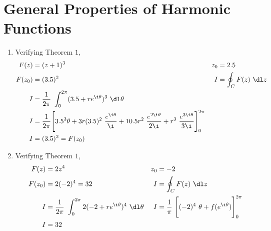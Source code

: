 \section{General Properties of Harmonic Functions}

\begin{enumerate}
    \item Verifying Theorem $ 1 $,
          \begin{align}
              F(z)   & = (z + 1)^3                                     &
              z_0    & = 2.5                                             \\
              F(z_0) & = (3.5)^3                                       &
              I      & = \oint_C F(z)\ \dl z                             \\
              I      & = \frac{1}{2\pi}\ \int_{0}^{2\pi}
              (3.5 + re^{\i \theta})^3\ \dl \theta                       \\
              I      & = \frac{1}{2\pi}\Bigg[ 3.5^3 \theta + 3r(3.5)^2
                  \ \frac{e^{\i \theta}}{\i} + 10.5r^2\ \frac{e^{2\i \theta}}
              {2\i} + r^3\ \frac{e^{3\i \theta}}{3\i}\Bigg]_0^{2\pi}     \\
              I      & = (3.5)^3 = F(z_0)
          \end{align}

    \item Verifying Theorem $ 1 $,
          \begin{align}
              F(z)   & = 2z^4                                                   &
              z_0    & = -2                                                       \\
              F(z_0) & = 2(-2)^4 = 32                                           &
              I      & = \oint_C F(z)\ \dl z                                      \\
              I      & = \frac{1}{2\pi}\ \int_{0}^{2\pi}
              2(-2 + re^{\i \theta})^4\ \dl \theta
                     &
              I      & = \frac{1}{\pi}\ \Bigg[ (-2)^4\ \theta + f(e^{\i\theta})
              \Bigg]_0^{2\pi}                                                     \\
              I      & = 32
          \end{align}


\end{enumerate}
